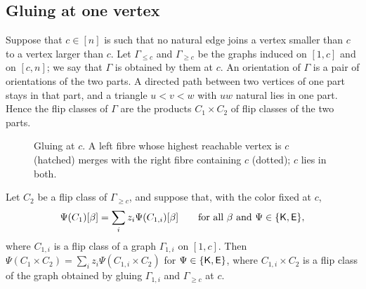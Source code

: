 \subsection{Gluing at one vertex}

Suppose that $c\in[n]$ is such that no natural edge joins a vertex smaller
than $c$ to a vertex larger than $c$.
Let $\Gamma_{\leq c}$ and $\Gamma_{\geq c}$ be the graphs induced on $[1,c]$ and
on $[c,n]$; we say that $\Gamma$ is obtained by  them at $c$.
An orientation of $\Gamma$ is a pair of orientations of the two parts.
A directed path between two vertices of one part stays in that part, and a
triangle $u<v<w$ with $uw$ natural lies in one part.
Hence the flip classes of $\Gamma$ are the products $C_1\times C_2$ of flip
classes of the two parts.

\begin{figure}[!ht]
\centering
{}
\caption{Gluing at $c$.
A left fibre whose highest reachable vertex is $c$ (hatched) merges with the right
fibre containing $c$ (dotted); $c$ lies in both.}
\label{fig:gluing}
\end{figure}

\begin{lemma}\label{lem:gluing}
Let $C_2$ be a flip class of $\Gamma_{\geq c}$, and suppose that, with the
color fixed at $c$,
\[
 \Psi(C_1)[\beta]=\sum_iz_i\Psi(C_{1,i})[\beta]
 \qquad\text{for all $\beta$ and $\Psi\in\{\mathsf{K},\mathsf{E}\}$},
\]
where $C_{1,i}$ is a flip
class of a graph $\Gamma_{1,i}$ on $[1,c]$.
Then $\Psi(C_1\times C_2)=\sum_iz_i\Psi(C_{1,i}\times C_2)$ for $\Psi\in\{\mathsf{K},\mathsf{E}\}$, where
$C_{1,i}\times C_2$ is a flip class of the graph obtained by gluing
$\Gamma_{1,i}$ and $\Gamma_{\geq c}$ at $c$.
\end{lemma}

